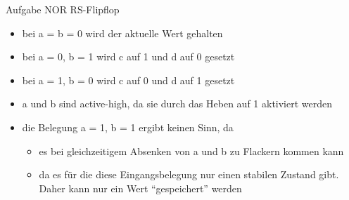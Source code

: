 \begin{frame}[allowframebreaks]{Aufgabe \thesection}{NOR RS-Flipflop}
  \begin{solution}
    \begin{itemize}
      \item bei a = b = 0 wird der aktuelle \alert{Wert gehalten}
      \item bei a = 0, b = 1 wird c auf 1 und d auf 0 gesetzt 
      \item bei a = 1, b = 0 wird c auf 0 und d auf 1 gesetzt
    \end{itemize}
  \end{solution}
  \begin{solution}
    \begin{itemize}
      \item a und b sind \alert{active-high}, da sie durch das Heben auf 1 aktiviert werden
    \end{itemize}
  \end{solution}
  \begin{solution}
    \begin{itemize}
      \item die Belegung a = 1, b = 1 ergibt keinen Sinn, da 
      \begin{itemize}
        \item es bei gleichzeitigem Absenken von a und b zu \alert{Flackern} kommen kann
        \item da es für die diese Eingangsbelegung \alert{nur einen stabilen Zustand} gibt. Daher kann \alert{nur ein Wert \enquote{gespeichert}} werden
      \end{itemize}
    \end{itemize}
  \end{solution}
\end{frame}
